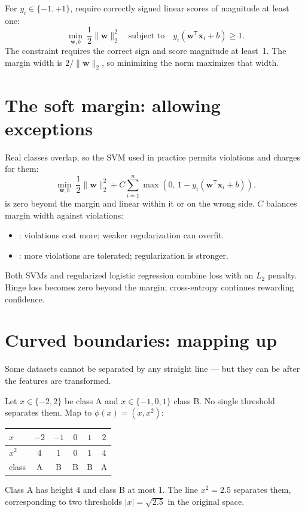 For $y_i\in\{-1,+1\}$, require correctly signed linear scores of magnitude at least one:
\[
  \min_{\bm{w},b}\ \frac{1}{2}\|\bm{w}\|_2^2
  \quad\text{subject to}\quad
  y_i(\bm{w}^{\mathsf T}\bm{x}_i+b)\geq 1 .
\]
The constraint requires the correct sign and score magnitude at least~1. The margin width is $2/\|\bm w\|_2$, so minimizing the norm maximizes that width.

\section{The soft margin: allowing exceptions}

Real classes overlap, so the SVM used in practice permits violations and charges for them:
\[
  \min_{\bm{w},b}\
  \frac{1}{2}\|\bm{w}\|_2^2
  +C\sum_{i=1}^{n}
  \max\!\left(0,\,1-y_i(\bm{w}^{\mathsf T}\bm{x}_i+b)\right).
\]
 is zero beyond the margin and linear within it or on the wrong side. $C$ balances margin width against violations:

\begin{itemize}
  \item {}: violations cost more; weaker regularization can overfit.
  \item \term{Small $C$}: more violations are tolerated; regularization is stronger.
\end{itemize}

Both SVMs and regularized logistic regression combine loss with an $L_2$ penalty. Hinge loss becomes zero beyond the margin; cross-entropy continues rewarding confidence.

\section{Curved boundaries: mapping up}

Some datasets cannot be separated by any straight line --- but they can be after the features are transformed.

\begin{workedexample}
Let $x\in\{-2,2\}$ be class A and $x\in\{-1,0,1\}$ class B. No single threshold separates them. Map to $\phi(x)=(x,x^2)$:
\begin{mltable}
\begin{tabular}{@{}lccccc@{}}
\toprule
\rowcolor{MLPaleBlue!92}
$x$ & $-2$ & $-1$ & $0$ & $1$ & $2$ \\
\midrule
$x^2$ & $4$ & $1$ & $0$ & $1$ & $4$ \\
class & A & B & B & B & A \\
\bottomrule
\end{tabular}
\end{mltable}
Class A has height 4 and class B at most 1. The line $x^2=2.5$ separates them, corresponding to two thresholds $|x|=\sqrt{2.5}$ in the original space.
\end{workedexample}

